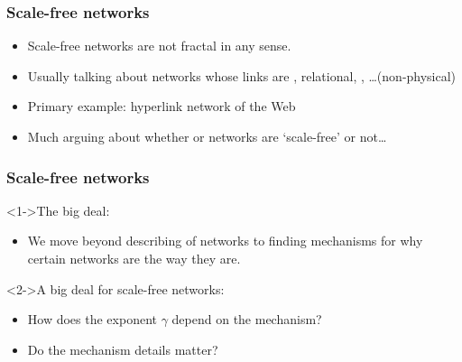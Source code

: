 \begin{frame}[label=]
  \frametitle{Scale-free networks}

  \begin{itemize}
  \item<1->
    Scale-free networks are \alert{not fractal} in any sense.
  \item<2->
    Usually talking about networks whose links are
    , 
    \alert{relational}, 
    , 
    \ldots (non-physical)
  \item<3->
    Primary example: hyperlink network of the Web
  \item<4->
    Much arguing about whether or networks are `scale-free' or not\ldots
  \end{itemize}

\end{frame}



\begin{frame}[label=]
 \frametitle{Scale-free networks}

 \begin{block}<1->{The big deal:}
   \begin{itemize}
   \item<1->
     We move beyond describing of networks
     to finding \alert{mechanisms} for why
     certain networks are the way they are.
   \end{itemize}
 \end{block}

 \begin{block}<2->{A big deal for scale-free networks:}
   \begin{itemize}
   \item<2->
     How does the exponent $\gamma$ depend on the mechanism?
   \item<3->
     Do the mechanism details matter?
   \end{itemize}
 \end{block}
 
\end{frame}

